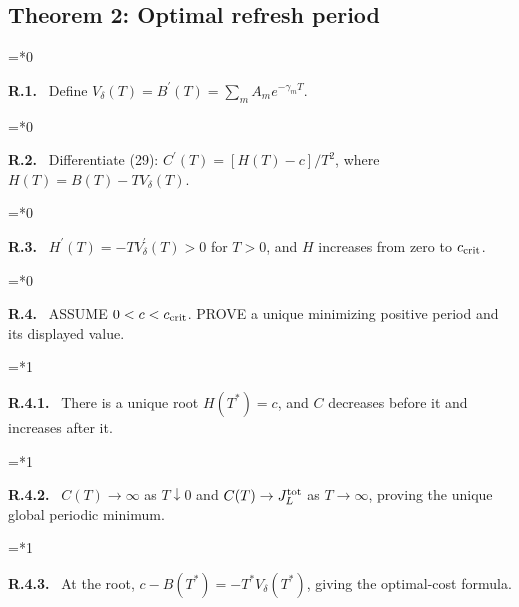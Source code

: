 \documentclass[11pt,letterpaper]{article}
\newenvironment{proofstep}[2]{%
  \begin{list}{}{\leftmargin=\dimexpr 0.17in*#2\relax%
  \setlength{\rightmargin}{0pt}\setlength{\topsep}{5pt}\setlength{\parsep}{2pt}}%
  \item[]\textbf{\textcolor{ink}{#1.}}\ }{\end{list}}
\begin{document}
\subsection{Theorem 2: Optimal refresh period}
\begin{proofstep}{R.1}{0}
Define $V_\delta(T)=B^{\prime}(T)=\sum_m A_m e^{-\gamma_mT}$.
\par\nopagebreak{}
\end{proofstep}
\begin{proofstep}{R.2}{0}
Differentiate (29): $C^{\prime}(T)=[H(T)-c]/T^2$, where $H(T)=B(T)-TV_\delta(T)$.
\par\nopagebreak{}
\end{proofstep}
\begin{proofstep}{R.3}{0}
$H^{\prime}(T)=-TV_\delta^{\prime}(T)>0$ for $T>0$, and $H$ increases from zero to $c_{\rm crit}$.
\par\nopagebreak{}
\end{proofstep}
\begin{proofstep}{R.4}{0}
ASSUME $0<c<c_{\rm crit}$. PROVE a unique minimizing positive period and its displayed value.
\par\nopagebreak{}
\end{proofstep}
\begin{proofstep}{R.4.1}{1}
There is a unique root $H(T^*)=c$, and $C$ decreases before it and increases after it.
\par\nopagebreak{}
\end{proofstep}
\begin{proofstep}{R.4.2}{1}
$C(T)\to\infty$ as $T\downarrow0$ and $C(T)\to J_L^{\rm tot}$ as $T\to\infty$, proving the unique global periodic minimum.
\par\nopagebreak{}
\end{proofstep}
\begin{proofstep}{R.4.3}{1}
At the root, $c-B(T^*)=-T^*V_\delta(T^*)$, giving the optimal-cost formula.
\par\nopagebreak{}
\end{proofstep}
\end{document}
